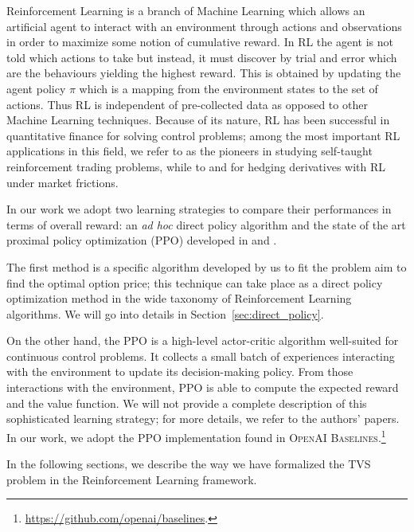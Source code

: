 \documentclass[11pt]{article}
\begin{document}
Reinforcement Learning is a branch of Machine Learning which allows an artificial agent to interact with an environment through actions and observations in order to maximize some notion of cumulative reward. In RL the agent is not told which actions to take but instead, it must discover by trial and error which are the behaviours  yielding the highest reward. This is obtained by updating the agent policy $\pi$ which is a mapping from the environment states to the set of actions. Thus RL is independent of pre-collected data as opposed to other Machine Learning techniques. Because of its nature, RL has been successful in quantitative finance for solving control problems; among the most important RL applications in this field, we refer to \textcite{Deng2017} as the pioneers in studying self-taught reinforcement trading problems, while to \textcite{Kolm2019} and \textcite{Halperin2020}  for hedging derivatives with RL under market frictions.

In our work we adopt two learning strategies to compare their performances in terms of overall reward: an \textit{ad hoc} direct policy algorithm and the state of the art proximal policy optimization (PPO) developed in \textcite{Schulman2017} and \textcite{Schulman2016}. 

The first method is a specific algorithm developed by us to fit the problem aim to find the optimal option price; this technique can take place as a direct policy optimization method in the wide taxonomy of Reinforcement Learning algorithms. We will go into details in Section~\ref{sec:direct_policy}.

On the other hand, the PPO is a high-level actor-critic algorithm well-suited for continuous control problems. It collects a small batch of experiences interacting with the environment to update its decision-making policy. From those interactions with the environment, PPO is able to compute the expected reward and the value function. We will not provide a complete description of this sophisticated learning strategy; for more details, we refer to the authors' papers. In our work, we adopt the PPO implementation found in \textsc{OpenAI Baselines}.\footnote{\url{https://github.com/openai/baselines}.} 

In the following sections, we describe the way we have formalized the TVS problem in the Reinforcement Learning framework.
\end{document}
